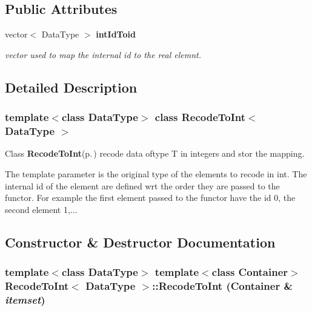 \subsection*{Public Attributes}
\begin{CompactItemize}
\item 
vector$<$ Data\-Type $>$ {\bf int\-Id\-Toid}\label{class_recode_to_int_0286413c937d57bc153465e4c7625d6c}

\begin{CompactList}\small\item\em vector used to map the internal id to the real elemnt. \item\end{CompactList}\end{CompactItemize}


\subsection{Detailed Description}
\subsubsection*{template$<$class Data\-Type$>$ class Recode\-To\-Int$<$ Data\-Type $>$}

Class {\bf Recode\-To\-Int}{\rm (p.\,\pageref{class_recode_to_int})} recode data oftype T in integers and stor the mapping. 

The template parameter is the original type of the elements to recode in int. The internal id of the element are defined wrt the order they are passed to the functor. For example the first element passed to the functor have the id 0, the second element 1,... 



\subsection{Constructor \& Destructor Documentation}
\subsubsection{\setlength{\rightskip}{0pt plus 5cm}template$<$class Data\-Type$>$ template$<$class Container$>$ {\bf Recode\-To\-Int}$<$ Data\-Type $>$::{\bf Recode\-To\-Int} (Container \& {\em itemset})\hspace{0.3cm}{\tt  [inline]}}\label{class_recode_to_int_c79659f9e5d7b2a894cb9edaed32b32d}


